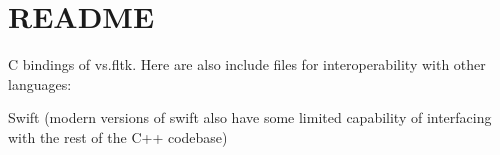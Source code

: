 \chapter{README}
\hypertarget{md_include_2cbindings_2README}{}\label{md_include_2cbindings_2README}
C bindings of {\ttfamily vs.\+fltk}. Here are also include files for interoperability with other languages\+:
\begin{DoxyItemize}
\item Swift (modern versions of swift also have some limited capability of interfacing with the rest of the C++ codebase) 
\end{DoxyItemize}